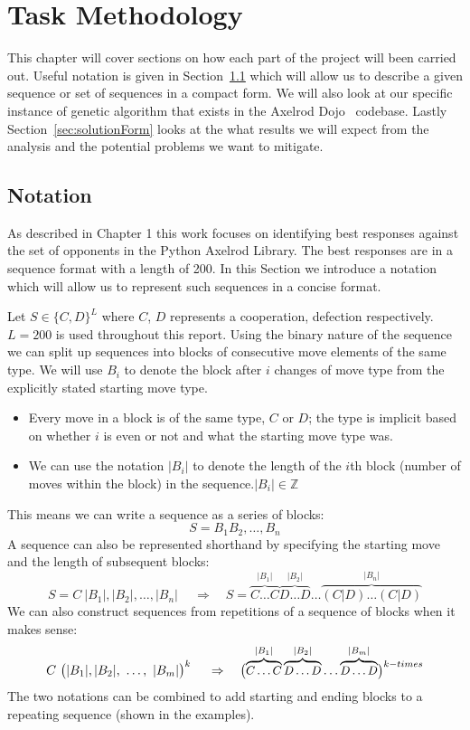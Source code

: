 
\chapter{Task Methodology}\label{ch:taskBackground}
This chapter will cover sections on how each part of the project will been carried out.
Useful notation is given in Section~\ref{sec:notation} which will allow us to describe a given sequence or set of sequences in a compact form.
We will also look at our specific instance of genetic algorithm that exists in the Axelrod Dojo~\cite{dojoV008} codebase.
Lastly Section~\ref{sec:solutionForm} looks at the what results we will expect from the analysis and the potential problems we want to mitigate.

\section{Notation}\label{sec:notation}
As described in Chapter 1 this work focuses on identifying best responses against the set of opponents in the Python Axelrod Library. The best responses are in a sequence format with a length of 200. In this Section we introduce a notation which will allow us to represent such sequences in a concise format.

Let \(S\in\{C, D\}^L\) where \(C\), \(D\) represents a cooperation, defection respectively.
\(L=200\) is used throughout this report.
Using the binary nature of the sequence we can split up sequences into blocks of consecutive move elements of the same type.
We will use \(B_i\) to denote the block after \(i\) changes of move type from the explicitly stated starting move type.
\begin{itemize}
    \item Every move in a block is of the same type, $C$ or $D$;
    the type is implicit based on whether \(i\) is even or not and what the starting move type was.
    \item We can use the notation \(|B_i|\) to denote the length of the \(i\)th block (number of moves within the block) in the sequence.\(|B_i| \in \mathbb{Z}\)
\end{itemize}

This means we can write a sequence as a series of blocks:
\[S= B_1 B_2,\ldots,B_n\]
A sequence can also be represented shorthand by specifying the starting move and the length of subsequent blocks:
\[S = C\ |B_1|,|B_2|,\ldots,|B_n|\ \quad \Rightarrow \quad S=\overbrace{C\ldots C}^{|B_1|}\overbrace{D\ldots D}^{|B_2|}\ldots\overbrace{(C|D)\ldots (C|D)}^{|B_n|} \]
We can also construct sequences from repetitions of a sequence of blocks when it makes sense:
\[C\ \big{(}|B_1|,|B_2|,\ \ldots,\ |B_m|\big{)}^{k}\ \quad \Rightarrow \quad \big{(}\small{\overbrace{C\ldots C}^{|B_1|}\overbrace{D\ldots D}^{|B_2|}\ldots\overbrace{D\ldots D}^{|B_m|}}\big{)}^{k-times}\]
The two notations can be combined to add starting and ending blocks to a repeating sequence (shown in the examples).

